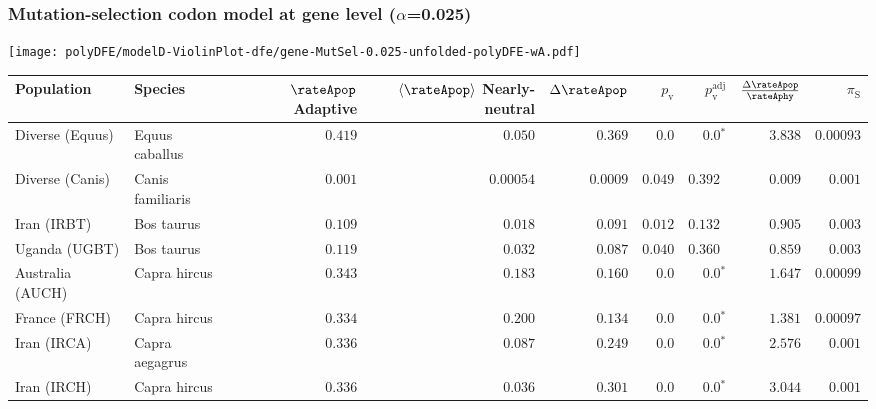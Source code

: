 \subsubsection*{Mutation-selection codon model at gene level ($\alpha$=0.025)}
\begin{center}
    \texttt{[image: polyDFE/modelD-ViolinPlot-dfe/gene-MutSel-0.025-unfolded-polyDFE-wA.pdf]}
    \begin{adjustbox}{width = 1\textwidth}
        \begin{tabular}{|l|l|r|r|r|r|r|r|r|}
            \toprule
            Population & Species & \specialcell{$\rateApop$ \\ Adaptive}                & \specialcell{$\left< \rateApop \right>$ \\ Nearly-neutral}                & $\Delta \rateApop $    & $p_{\mathrm{v}}$ & $p_{\mathrm{v}}^{\mathrm{adj}}$ & $\frac{\Delta\rateApop}{\rateAphy}$ & $\pi_{\textrm{S}}$ \\
            \midrule
            Diverse (Equus)                    & Equus caballus          & $ 0.419$ & $ 0.050$  & $ 0.369$ & $0.0$ & $\bm{0.0{^*}}$     & $ 3.838$ & $0.00093$  \\
            Diverse (Canis)                  & Canis familiaris          & $ 0.001$ & $0.00054$  & $0.0009$ & $ 0.049$ & $ 0.392~~$     & $ 0.009$ & $ 0.001$ \\
            Iran (IRBT)               & Bos taurus        & $ 0.109$ & $ 0.018$  & $ 0.091$ & $ 0.012$    & $ 0.132~~$ & $ 0.905$ & $ 0.003$ \\
            Uganda (UGBT)                  & Bos taurus        & $ 0.119$ & $ 0.032$  & $ 0.087$ & $ 0.040$    & $ 0.360~~$ & $ 0.859$ & $ 0.003$ \\
            Australia (AUCH)                    & Capra hircus      & $ 0.343$ & $ 0.183$  & $ 0.160$ & $0.0$    & $\bm{0.0{^*}}$ & $ 1.647$ & $0.00099$ \\
            France (FRCH)                    & Capra hircus        & $ 0.334$ & $ 0.200$  & $ 0.134$ & $0.0$    & $\bm{0.0{^*}}$ & $ 1.381$ & $0.00097$ \\
            Iran (IRCA)                   & Capra aegagrus        & $ 0.336$ & $ 0.087$  & $ 0.249$ & $0.0$    & $\bm{0.0{^*}}$ & $ 2.576$ & $ 0.001$ \\
            Iran (IRCH)                 & Capra hircus        & $ 0.336$ & $ 0.036$  & $ 0.301$ & $0.0$    & $\bm{0.0{^*}}$ & $ 3.044$ & $ 0.001$ \\

\end{tabular}
\end{adjustbox}
\end{center}
